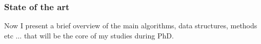 \documentclass[a4paper,11pt, oneside]{article}
\makeatletter
\renewcommand{\paragraph}{%
  \@startsection{paragraph}{4}%
  {\z@}{1.25ex \@plus 1ex \@minus .2ex}{-1em}%
  {\normalfont\normalsize\bfseries}%
}
\makeatother
\begin{document}
\subsubsection*{State of the art}
Now I present a brief overview of the main algorithms, data structures,
methods etc $\ldots$ that will be the core of my studies during PhD. 
\end{document}
